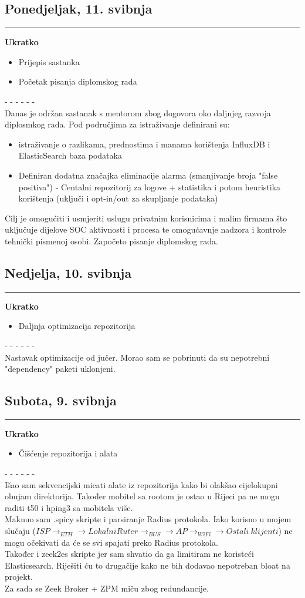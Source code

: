 \documentclass[12pt, a4paper]{article}
\newcommand{\dan}[1]{
    \subsection*{#1}
    \vspace{-0.5em} 
    \hrule \vspace{0.5em} 
}
\begin{document}
\dan{Ponedjeljak, 11. svibnja}
\textbf{Ukratko}
\begin{itemize}
    \item Prijepis sastanka
    \item Početak pisanja diplomskog rada
\end{itemize}
- - - - - - \\
Danas je održan sastanak s mentorom zbog dogovora oko daljnjeg razvoja diplosmkog rada.
Pod područjima za istraživanje definirani su:
\begin{itemize}
    \item istraživanje o razlikama, prednostima i manama korištenja InfluxDB i ElasticSearch baza podataka
    \item Definiran dodatna značajka eliminacije alarma (smanjivanje broja "false positiva")
    \subitem - Centalni repozitorij za logove + statistika i potom heuristika korištenja (uključi i opt-in/out za skupljanje podataka)
\end{itemize}
Cilj je omogućiti i usmjeriti uslugu privatnim korisnicima i malim firmama što uključuje dijelove SOC aktivnosti i procesa te omogućavnje nadzora i kontrole tehnički pismenoj osobi.
Započeto pisanje diplomskog rada.

\dan{Nedjelja, 10. svibnja}
\textbf{Ukratko}
\begin{itemize}
    \item Daljnja optimizacija repozitorija
\end{itemize}
- - - - - - \\
Nastavak optimizacije od jučer. Morao sam se pobrinuti da su nepotrebni "dependency" paketi uklonjeni.

\dan{Subota, 9. svibnja}
\textbf{Ukratko}
\begin{itemize}
    \item Čišćenje repozitorija i alata
\end{itemize}
- - - - - - \\
Išao sam sekvencijski micati alate iz repozitorija kako bi olakšao cijelokupni obujam direktorija. Također mobitel sa rootom je ostao u Rijeci pa ne mogu raditi t50 i hping3 sa mobitela više.
\\
Maknuo sam .spicy skripte i parsiranje Radius protokola. Iako korisno u mojem slučaju ($ISP \rightarrow_{ETH}\rightarrow LokalniRuter \rightarrow_{BUS} \rightarrow AP \rightarrow_{WiFi}\rightarrow Ostali\ klijenti$) ne mogu očekivati da će se svi spajati preko Radius protokola.
\\
Također i zeek2es skripte jer sam shvatio da ga limitiram ne koristeći Elasticsearch. Riješiti ću to drugačije kako ne bih dodavao nepotreban bloat na projekt.
\\
Za sada se Zeek Broker + ZPM miču zbog redundancije.
\end{document}
